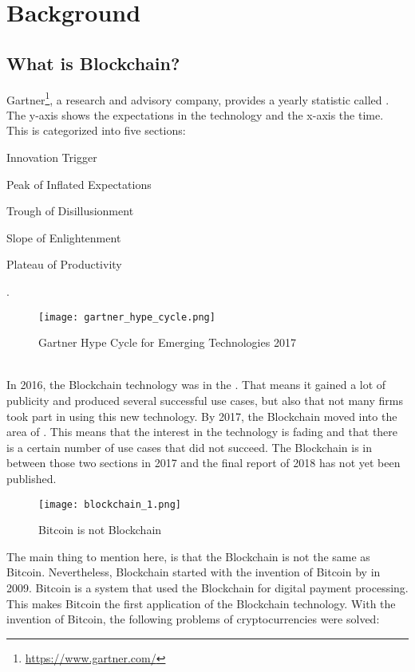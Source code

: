 \section{Background}
\label{sec:Background}
\subsection{What is Blockchain?}
\label{subsection:WhatIsBlockchain}
Gartner\footnote{\url{https://www.gartner.com/}}, a research and advisory company, provides a yearly statistic called . The y-axis shows the expectations in the technology and the x-axis the time. This is categorized into five sections:
\begin{enumerate*}[label={\arabic*)},font={\color{red!50!black}\bfseries}]
	\item Innovation Trigger
	\item Peak of Inflated Expectations
	\item Trough of Disillusionment
	\item Slope of Enlightenment
	\item Plateau of Productivity
\end{enumerate*}.  
\begin{figure}[!ht]
    \centering
    \texttt{[image: gartner\_hype\_cycle.png]}
    \label{gartner_hype_cycle}
    \caption{Gartner Hype Cycle for Emerging Technologies 2017}
\end{figure} \\
In 2016, the Blockchain technology was in the . That means it gained a lot of publicity and produced several successful use cases, but also that not many firms took part in using this new technology. By 2017, the Blockchain moved into the area of . This means that the interest in the technology is fading and that there is a certain number of use cases that did not succeed. The Blockchain is in between those two sections in 2017 and the final report of 2018 has not yet been published. \cite{2017_Panetta} \\
\begin{figure}[!ht]
    \centering
    \texttt{[image: blockchain\_1.png]}
    \label{blockchain_1}
    \caption{Bitcoin is not Blockchain}
\end{figure}
The main thing to mention here, is that the Blockchain is not the same as Bitcoin. Nevertheless, Blockchain started with the invention of Bitcoin by \citet{2009_Nakamoto} in 2009. Bitcoin is a system that used the Blockchain for digital payment processing. This makes Bitcoin the first application of the Blockchain technology. With the invention of Bitcoin, the following problems of cryptocurrencies were solved:
